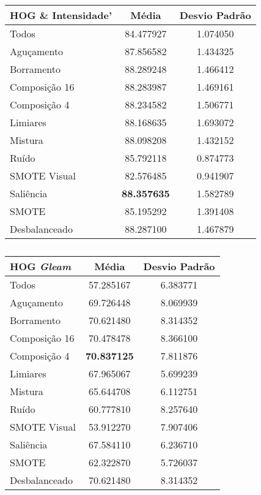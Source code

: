 \begin{table}[!htbp]
\centering
\caption{}
\label{tab:resultados:x:melhor}
\begin{tabular}{|l|c|c|}
\hline
\textbf{HOG \& Intensidade'} & \textbf{Média}     & \textbf{Desvio Padrão} \\ \hline
   Todos        & 84.477927  & 1.074050  \\ \hline
  Aguçamento    & 87.856582  & 1.434325  \\ \hline
  Borramento    & 88.289248  & 1.466412  \\ \hline
  Composição 16 & 88.283987  & 1.469161  \\ \hline
  Composição 4  & 88.234582  & 1.506771  \\ \hline
  Limiares      & 88.168635  & 1.693072  \\ \hline
  Mistura       & 88.098208  & 1.432152  \\ \hline
  Ruído         & 85.792118  & 0.874773  \\ \hline
  SMOTE Visual  & 82.576485  & 0.941907  \\ \hline
  Saliência     & \textbf{88.357635}  & 1.582789  \\ \hline
 SMOTE          & 85.195292  & 1.391408  \\ \hline
Desbalanceado   & 88.287100  & 1.467879  \\ \hline
\end{tabular}
\end{table}


\begin{table}[!htbp]
\centering
\caption{}
\label{tab:resultados:x:melhor}
\begin{tabular}{|l|c|c|}
\hline
\textbf{HOG \emph{Gleam}} & \textbf{Média}     & \textbf{Desvio Padrão} \\ \hline
   Todos        &  57.285167 &  6.383771  \\ \hline
  Aguçamento    &  69.726448 &  8.069939  \\ \hline
  Borramento    &  70.621480 &  8.314352  \\ \hline
  Composição 16 &  70.478478 &  8.366100  \\ \hline
  Composição 4  &  \textbf{70.837125} &  7.811876  \\ \hline
  Limiares      &  67.965067 &  5.699239  \\ \hline
  Mistura       &  65.644708 &  6.112751  \\ \hline
  Ruído         &  60.777810 &  8.257640  \\ \hline
  SMOTE Visual  &  53.912270 &  7.907406  \\ \hline
  Saliência     &  67.584110 &  6.236710  \\ \hline
 SMOTE          &  62.322870 &  5.726037  \\ \hline
Desbalanceado   &  70.621480 &  8.314352  \\ \hline
\end{tabular}
\end{table}

